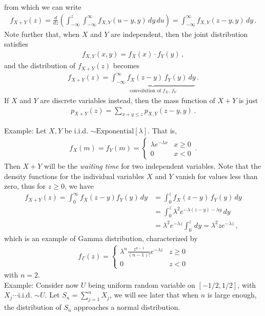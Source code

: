 \documentclass[11pt, onesided]{book}
\theoremstyle{break}
\theoremstyle{break}
\newcommand{\example}{\color{green}Example: \color{black}}
\begin{document}
from which we can write
\begin{align*}
f_{X+Y}(z) = \frac{d}{dz}\left( \int_{-\infty}^z\int_{-\infty}^\infty f_{X,Y}(u-y,y)\, dy\, du\right) = \int_{-\infty}^\infty f_{X,Y}(z-y, y)\, dy\,.
\end{align*}
Note further that, when $X$ and $Y$ are independent, then the joint distribution satisfies
\begin{align*}
f_{X,Y}(x,y) = f_X(x) \cdot f_Y(y)\,,
\end{align*}
and the distribution of $f_{X+Y}(z)$ becomes
\begin{align*}
f_{X+Y}(z) = \underbrace{\int_{-\infty}^\infty f_X(z-y)\, f_Y(y) \, dy}_{\text{convolution of }f_X,\, f_Y}\,.
\end{align*}
If $X$ and $Y$ are discrete variables instead, then the mass function of $X+Y$ is just
\begin{align*}
p_{X+Y}(z) = \sum_{x+y\leq z}p_{X,Y}(z-y,y)\,.
\end{align*}

\example Let $X,Y$ be i.i.d. $\sim \text{Exponential}[\lambda]$. That is,
\begin{align*}
f_X(m) = f_Y(m) =\begin{cases}
\lambda e^{-\lambda x} & x\geq 0\\
0 & x<0
\end{cases}\,.
\end{align*}
Then $X+Y$ will be the \textit{waiting time} for two independent variables. Note that the density functions for the individual variables $X$ and  $Y$ vanish for values less than zero, thus for $z\geq 0$, we have
\begin{align*}
f_{X+Y}(z) = \int_{0}^\infty f_X(z-y)f_Y(y)\, dy 
&= \int_0^z f_X(z-y)\,f_Y(y)\, dy \\
&=\int_0^z \lambda^2 e^{-\lambda (z-y) - \lambda y}\, dy \\
&= \lambda^2 e^{-\lambda z}\int_0^z \, dy = \lambda^2 ze^{-\lambda z}\,,
\end{align*}
which is an example of Gamma distribution, characterized by
\begin{align*}
f_{\Gamma}(z) = \begin{cases}
\lambda^n \frac{z^{n-1}}{(n-1)!}e^{-\lambda z} & z\geq 0\\
0 & z<0
\end{cases}
\end{align*}
with $n=2$.\\


\example Consider now $U$ being uniform random variable on $[-1/2, 1/2]$, with $X_j\cdots $i.i.d. $\sim U$. Let $S_n = \sum_{j=1}^n X_j$, we will see later that when $n$ is large enough, the distribution of $S_n$ approaches a normal distribution.\\
\end{document}
